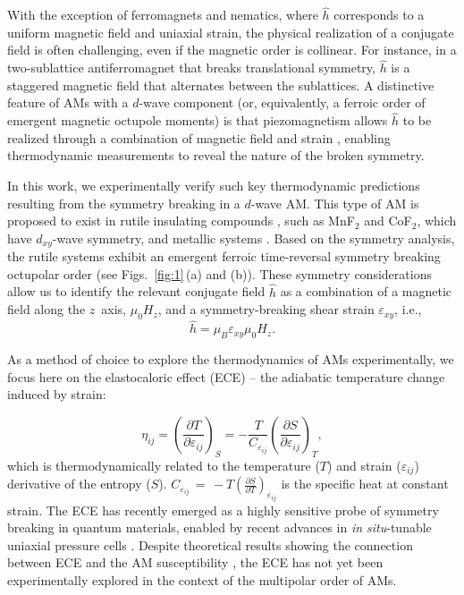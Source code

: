 \documentclass[
 reprint,










 amsmath,amssymb,
 aps,






]{revtex4-2}
\begin{document}
With the exception of ferromagnets and nematics, where $\hat{h}$ corresponds to a uniform magnetic field and uniaxial strain, the physical realization of a conjugate field is often challenging, even if the magnetic order is collinear. For instance, in a two-sublattice antiferromagnet that breaks translational symmetry, $\hat{h}$
is a staggered magnetic field that alternates between the sublattices. A distinctive feature of AMs with a $d$-wave component (or, equivalently, a ferroic order of emergent magnetic octupole moments) is that piezomagnetism \cite{Moriya59,Dzyaloshinskii57,Tavger58} allows $\hat{h}$ to be realized through a combination of magnetic field and strain \cite{Steward23,McC24,Li2024strain,Yershov24,Khodas25,Chakarborty2025}, enabling thermodynamic measurements to reveal the nature of the broken symmetry.

In this work, we experimentally verify such key thermodynamic predictions resulting from the symmetry breaking in a $d$-wave AM. This type of AM is proposed to exist in rutile insulating compounds \cite{Smejkal22,Roig24,Bho24,Morano24,Antonenko2025}, such as MnF$_2$ and CoF$_2$, which have $d_{xy}$-wave symmetry,  and metallic systems \cite{Jiang25,Sun25}
. Based on the symmetry analysis, the rutile systems exhibit an emergent ferroic time-reversal symmetry breaking octupolar order \cite{Bho24} (see Figs.~\ref{fig:1}\,(a) and (b)).  These  symmetry considerations allow us to  identify the relevant conjugate field $\hat{h}$ as a combination of a magnetic field along the $z$~axis, $\mu_0 H_z$, and a symmetry-breaking shear strain $\varepsilon_{xy}$, i.e.,
\begin{equation}
\hat{h}=\mu_B\varepsilon_{xy} \mu_0H_z.
    \label{eq:conj_fieldAM}
\end{equation}





As a method of choice to explore the thermodynamics of AMs \cite{Patri19,McC24,Yershov24} experimentally, we focus here on the elastocaloric effect (ECE) -- the adiabatic temperature change induced by strain:

\begin{equation}
    \eta_{ij} = \left(\frac{\partial T}{\partial \varepsilon_{ij}}\right)_S=-\frac{T}{C_{\varepsilon_{ij}}}\left(\frac{\partial S}{\partial \varepsilon_{ij}}\right)_T,
\end{equation}
which is thermodynamically related to the temperature ($T$) and strain ($\varepsilon_{ij}$) derivative of the entropy ($S$).  $C_{\varepsilon_{ij}}\,=\,-T\left(\frac{\partial S}{\partial T}\right)_{\varepsilon_{ij}}$ is the specific heat at constant strain. The ECE has recently emerged as a highly sensitive probe of symmetry breaking in quantum materials, enabled by recent advances in \textit{in situ}-tunable uniaxial pressure cells \cite{Hicks14,Ike18,Li22,Ye22,Gati23,Ye24,Liu24,Lieberich25}. Despite theoretical results showing the connection between ECE and the AM susceptibility \cite{Chakarborty2025,Steward25}, the ECE has not yet been experimentally explored in the context of the multipolar order of AMs.
\end{document}
